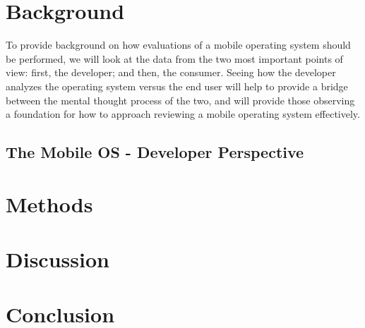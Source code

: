 \documentclass[11pt]{article}
\begin{document}
\section{Background}
To provide background on how evaluations of a mobile operating system should be performed, we will look at the data from the two most important points of view: first, the developer; and then, the consumer. Seeing how the developer analyzes the operating system versus the end user will help to provide a bridge between the mental thought process of the two, and will provide those observing a foundation for how to approach reviewing a mobile operating system effectively.
\subsection{The Mobile OS - Developer Perspective}
\section{Methods}
\section{Discussion}
\section{Conclusion}



\end{document}
